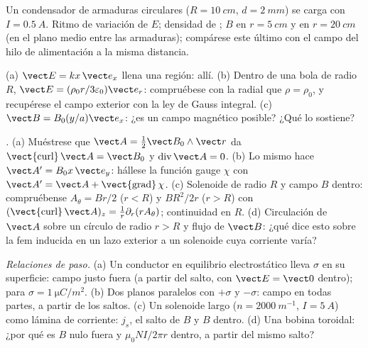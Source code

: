 \begin{exercise}[$\star$]\label{exo:b2:maxwell-equations:3}
Un condensador de armaduras circulares ($R = \qty{10}{cm}$, $d = \qty{2}{mm}$) se
carga con $I = \qty{0.5}{A}$. Ritmo de variación de $E$; densidad de ; $B$ en $r = \qty{5}{cm}$ y en $r = \qty{20}{cm}$ (en el
plano medio entre las armaduras); compárese este último con el campo del
hilo de alimentación a la misma distancia.
\end{exercise}

\begin{exercise}[$\star$]\label{exo:b2:maxwell-equations:4}
(a) $\vect E = kx\,\vect e_x$ llena una región:  allí. (b)
Dentro de una bola de radio $R$, $\vect E = (\rho_0r/3\varepsilon_0)\vect e_r$: compruébese con
la  radial que $\rho = \rho_0$, y recupérese el campo exterior
con la ley de Gauss integral. (c) $\vect B = B_0(y/a)\vect e_x$: ¿es un campo
magnético posible? ¿Qué  lo sostiene?
\end{exercise}

\begin{exercise}[$\star\star$]\label{exo:b2:maxwell-equations:5}
\emph{.} (a) Muéstrese que $\vect A = \tfrac12\vect B_0\wedge\vect r$
da $\operatorname{\vect{curl}}\vect A = \vect B_0$ y $\operatorname{div}\vect A = 0$.
(b) Lo mismo hace $\vect A' = B_0x\,\vect e_y$: hállese la función gauge $\chi$ con
$\vect A' = \vect A + \operatorname{\vect{grad}}\chi$. (c) Solenoide de radio $R$ y
campo $B$ dentro: compruébense $A_\theta = Br/2$ ($r < R$) y $BR^2/2r$ ($r > R$)
con $(\operatorname{\vect{curl}}\vect A)_z = \frac1r\partial_r(rA_\theta)$; continuidad en $R$.
(d) Circulación de $\vect A$ sobre un círculo de radio $r > R$ y flujo de
$\vect B$: ¿qué dice esto sobre la fem inducida en un lazo exterior a un
solenoide cuya corriente varía?
\end{exercise}

\begin{exercise}[$\star\star$]\label{exo:b2:maxwell-equations:6}
\emph{Relaciones de paso.} (a) Un conductor en equilibrio electrostático
lleva $\sigma$ en su superficie: campo justo fuera (a partir del salto, con
$\vect E = \vect 0$ dentro); para $\sigma = \qty{1}{\micro C/m^2}$. (b) Dos planos
paralelos con $+\sigma$ y $-\sigma$: campo en todas partes, a partir de los saltos.
(c) Un solenoide largo ($n = \qty{2000}{m^{-1}}$, $I = \qty{5}{A}$) como lámina
de corriente: $j_s$, el salto de $B$ y $B$ dentro. (d) Una bobina toroidal:
¿por qué es $B$ nulo fuera y $\mu_0NI/2\pi r$ dentro, a partir del mismo salto?
\end{exercise}

